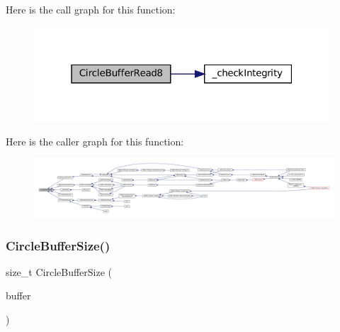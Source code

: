 Here is the call graph for this function\+:
\nopagebreak
\begin{figure}[H]
\begin{center}
\leavevmode
\includegraphics[width=313pt]{circle-buffer_8c_a715de2b8c3a6b466d1a2fd2f7efae286_cgraph}
\end{center}
\end{figure}
Here is the caller graph for this function\+:
\nopagebreak
\begin{figure}[H]
\begin{center}
\leavevmode
\includegraphics[width=350pt]{circle-buffer_8c_a715de2b8c3a6b466d1a2fd2f7efae286_icgraph}
\end{center}
\end{figure}
\mbox{\label{circle-buffer_8c_a3cd592fc508fc16e0687ef249a7985f6}} 
\subsubsection{\texorpdfstring{Circle\+Buffer\+Size()}{CircleBufferSize()}}
{\footnotesize\ttfamily size\+\_\+t Circle\+Buffer\+Size (\begin{DoxyParamCaption}\item[{const struct Circle\+Buffer $\ast$}]{buffer }\end{DoxyParamCaption})}

